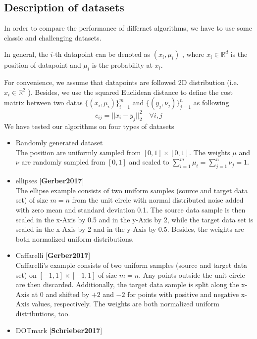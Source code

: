 \documentclass{article}
\begin{document}
\begin{large}
\subsection{Description of datasets}
In order to compare the performance of differnet algorithms, we have to use some classic and challenging datasets.

In general, the $i$-th datapoint can be denoted as $(x_{i},\mu_{i})$ , where $x_{i}\in \mathbb{R}^{d}$ is the position of datapoint and $\mu_{i}$ is the probability at $x_{i}$.

For convenience, we assume that datapoints are followed 2D distribution (i.e. $x_{i}\in \mathbb{R}^{2}$ ). Besides, we use the squared Euclidean distance to define the cost matrix between two datas $\{(x_{i},\mu_{i})\}_{i=1}^{m}$ and $\{(y_{j},\nu_{j})\}_{j=1}^{n}$ as following
\begin{equation}
  c_{ij}=||x_{i}-y_{j}||_{2}^{2}\quad\forall i, j
\end{equation}
We have tested our algorithms on four types of datasets
\begin{itemize}
  \item Randomly generated dataset\\
        The position are uniformly sampled from
        $[0, 1]\times[0, 1]$. The weights $\mu$ and $\nu$ are randomly sampled from $[0, 1]$ and scaled to $ \sum_{i=1}^{m}{\mu_i} = \sum_{j=1}^{n}{\nu_j} = 1 $.
  \item ellipses [\textbf{Gerber2017}]\\
  The ellipse example consists of two uniform samples (source and target data set) of size $m=n$ from the unit circle
  with normal distributed noise added with zero mean and standard deviation 0.1. The source
  data sample is then scaled in the x-Axis by 0.5 and in the y-Axis by 2, while the target
  data set is scaled in the x-Axis by 2 and in the y-Axis by 0.5.
  Besides, the weights are both normalized uniform distributions.
  \item Caffarelli [\textbf{Gerber2017}]\\
  Caffarelli’s example consists of two uniform samples (source and target data set) on $[-1, 1]\times[-1, 1]$  of size $m=n$. Any points outside the unit circle are then
discarded. Additionally, the target data sample is split along the x-Axis at 0 and shifted by
$+2$ and $-2$ for points with positive and negative x-Axis values, respectively. The weights are both normalized uniform distributions, too.
  \item DOTmark [\textbf{Schrieber2017}]\\

\end{itemize}
\end{large}
\end{document}
